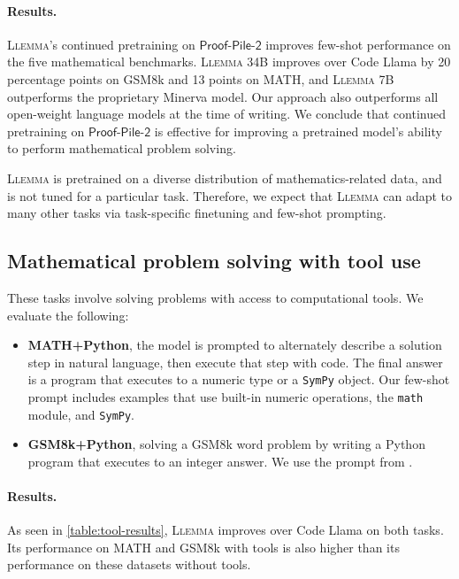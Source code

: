 \paragraph{Results.}
\textsc{Llemma}'s continued pretraining on $\mathsf{Proof}$-$\mathsf{Pile}$-$\mathsf{2}$ improves few-shot performance on the five mathematical benchmarks.
\textsc{Llemma} 34B improves over Code Llama by 20 percentage points on GSM8k and 13 points on MATH, and \textsc{Llemma} 7B outperforms the proprietary Minerva model. Our approach also outperforms all open-weight language models at the time of writing. We conclude that continued pretraining on $\mathsf{Proof}$-$\mathsf{Pile}$-$\mathsf{2}$ is effective for improving a pretrained model's ability to perform mathematical problem solving.

\textsc{Llemma} is pretrained on a diverse distribution of mathematics-related data,  and is not tuned for a particular task. Therefore, we expect that \textsc{Llemma} can adapt to many other tasks via task-specific finetuning and few-shot prompting.

\subsection{Mathematical problem solving with tool use} These tasks involve solving problems with access to computational tools. We evaluate the following:

\begin{itemize}[leftmargin=*]
\item \textbf{MATH+Python}, the model is prompted to alternately describe a solution step in natural language, then execute that step with code. The final answer is a program that executes to a numeric type or a \texttt{SymPy} object. Our few-shot prompt includes examples that use built-in numeric operations, the \texttt{math} module, and \texttt{SymPy}.
\item \textbf{GSM8k+Python},  solving a GSM8k word problem by writing a Python program that executes to an integer answer. We use the prompt from \cite{gao2023pal}. 
\end{itemize}

\paragraph{Results.} As seen in \autoref{table:tool-results}, \textsc{Llemma} improves over Code Llama on both tasks. Its performance on MATH and GSM8k with tools is also higher than its performance on these datasets without tools.

